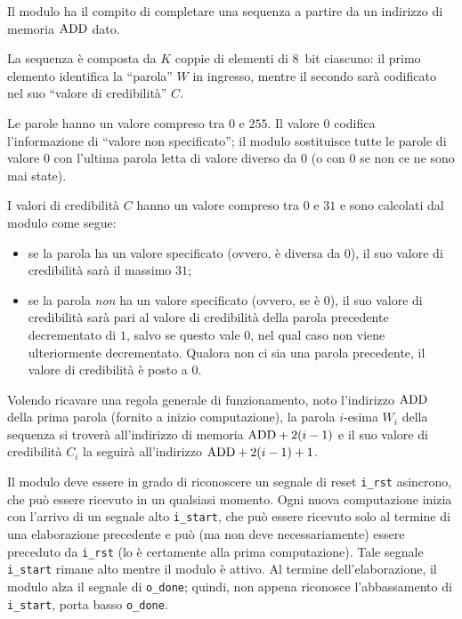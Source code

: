 \documentclass[12pt]{article}
\begin{document}
Il modulo ha il compito di completare una sequenza a partire da un indirizzo di memoria \(\textup{ADD}\) dato.

La sequenza è composta da \(K\) coppie di elementi di 8~bit ciascuno: il primo elemento identifica la ``parola'' \(W\) in ingresso, mentre il secondo sarà codificato nel suo ``valore di credibilità'' \(C\).

Le parole hanno un valore compreso tra \(0\) e \(255\). Il valore \(0\) codifica l'informazione di ``valore non specificato''; il modulo sostituisce tutte le parole di valore \(0\) con l'ultima parola letta di valore diverso da \(0\) (o con \(0\) se non ce ne sono mai state).

I valori di credibilità \(C\) hanno un valore compreso tra \(0\) e \(31\) e sono calcolati dal modulo come segue:
\begin{itemize}
    \item se la parola ha un valore specificato (ovvero, è diversa da \(0\)), il suo valore di credibilità sarà il massimo \(31\);
    \item se la parola \emph{non} ha un valore specificato (ovvero, se è \(0\)), il suo valore di credibilità sarà pari al valore di credibilità della parola precedente decrementato di \(1\), salvo se questo vale \(0\), nel qual caso non viene ulteriormente decrementato. Qualora non ci sia una parola precedente, il valore di credibilità è posto a \(0\).
\end{itemize}

Volendo ricavare una regola generale di funzionamento, noto l'indirizzo \(\textup{ADD}\) della prima parola (fornito a inizio computazione), la parola \(i\)-esima \(W_{i}\) della sequenza si troverà all'indirizzo di memoria \(\textup{ADD} + 2(i - 1)\) e il suo valore di credibilità \(C_i\) la seguirà all'indirizzo \(\textup{ADD} + 2(i - 1) + 1\).

Il modulo deve essere in grado di riconoscere un segnale di reset \texttt{i\_rst} asincrono, che può essere ricevuto in un qualsiasi momento.
Ogni nuova computazione inizia con l'arrivo di un segnale alto \texttt{i\_start}, che può essere ricevuto solo al termine di una elaborazione precedente e può (ma non deve necessariamente) essere preceduto da \texttt{i\_rst} (lo è certamente alla prima computazione). Tale segnale \texttt{i\_start} rimane alto mentre il modulo è attivo.
Al termine dell'elaborazione, il modulo alza il segnale di \texttt{o\_done}; quindi, non appena riconosce l'abbassamento di \texttt{i\_start}, porta basso \texttt{o\_done}.
\end{document}
